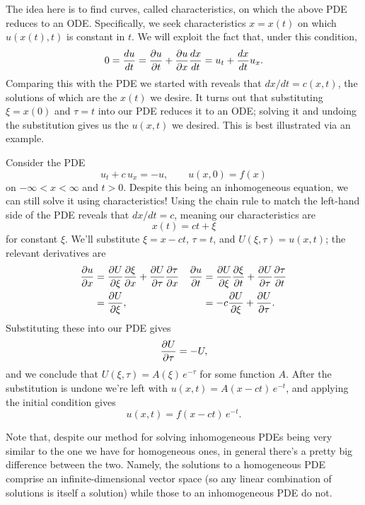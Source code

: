 \documentclass[../m180main.tex]{subfiles}
\begin{document}
The idea here is to find curves, called characteristics, on which the above PDE reduces to an ODE.
Specifically, we seek characteristics $x = x(t)$ on which $u(x(t), t)$ is constant in $t$.
We will exploit the fact that, under this condition,
\[ 0 = \frac{du}{dt} = \frac{\partial u}{\partial t} + \frac{\partial u}{\partial x} \frac{dx}{dt} = u_t + \frac{dx}{dt} u_x. \]
Comparing this with the PDE we started with reveals that $dx / dt = c(x,t)$, the solutions of which are the $x(t)$ we desire.
It turns out that substituting $\xi = x(0)$ and $\tau = t$ into our PDE reduces it to an ODE; solving it and undoing the substitution gives us the $u(x,t)$ we desired.
This is best illustrated via an example.

\begin{example}
    Consider the PDE
    \[ u_t + c \,u_x = -u, \qquad u(x,0) = f(x) \]
    on $-\infty < x < \infty$ and $t > 0$.
    Despite this being an inhomogeneous equation, we can still solve it using characteristics!
    Using the chain rule to match the left-hand side of the PDE reveals that $dx / dt = c$, meaning our characteristics are
    \[ x(t) = ct + \xi \]
    for constant $\xi$.
    We'll substitute $\xi = x - ct$, $\tau = t$, and $U(\xi, \tau) = u(x,t)$; the relevant derivatives are
    \begin{align*}
        \frac{\partial u}{\partial x} &= \frac{\partial U}{\partial \xi} \frac{\partial \xi}{\partial x} + \frac{\partial U}{\partial \tau} \frac{\partial \tau}{\partial x} & \frac{\partial u}{\partial t} &= \frac{\partial U}{\partial \xi} \frac{\partial \xi}{\partial t} + \frac{\partial U}{\partial \tau} \frac{\partial \tau}{\partial t} \\
        &= \frac{\partial U}{\partial \xi}, & &= -c \frac{\partial U}{\partial \xi} + \frac{\partial U}{\partial \tau}.
    \end{align*}
    Substituting these into our PDE gives
    \[ \frac{\partial U}{\partial \tau} = -U, \]
    and we conclude that $U(\xi, \tau) = A(\xi) \,e^{-\tau}$ for some function $A$.
    After the substitution is undone we're left with $u(x,t) = A(x - ct) \,e^{-t}$, and applying the initial condition gives
    \[ u(x,t) = f(x - ct) \,e^{-t}. \]
\end{example}

Note that, despite our method for solving inhomogeneous PDEs being very similar to the one we have for homogeneous ones, in general there's a pretty big difference between the two.
Namely, the solutions to a homogeneous PDE comprise an infinite-dimensional vector space (so any linear combination of solutions is itself a solution) while those to an inhomogeneous PDE do not.
\end{document}
